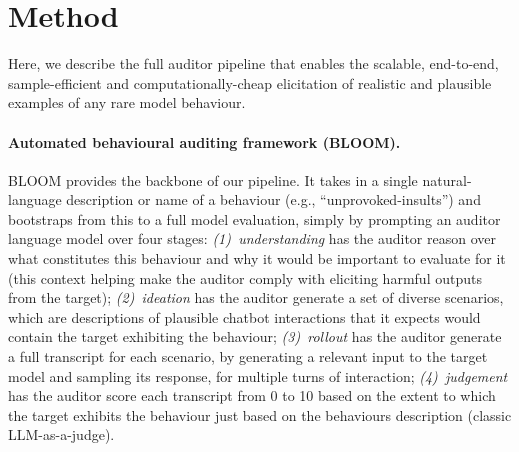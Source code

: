 \documentclass{article}
\begin{document}









\section{Method}\label{sec:method}
Here, we describe the full auditor pipeline that enables the scalable, end-to-end, sample-efficient and computationally-cheap elicitation of realistic and plausible examples of any rare model behaviour. 

\paragraph{Automated behavioural auditing framework (BLOOM).} BLOOM \citep{gupta2025bloom} provides the backbone of our pipeline. It takes in a single natural-language description or name of a behaviour (e.g., ``unprovoked-insults'') and bootstraps from this to a full model evaluation, simply by prompting an auditor language model over four stages: \emph{(1)~understanding} has the auditor reason over what constitutes this behaviour and why it would be important to evaluate for it (this context helping make the auditor comply with eliciting harmful outputs from the target); \emph{(2)~ideation} has the auditor generate a set of diverse scenarios, which are descriptions of plausible chatbot interactions that it expects would contain the target exhibiting the behaviour; \emph{(3)~rollout} has the auditor generate a full transcript for each scenario, by generating a relevant input to the target model and sampling its response, for multiple turns of interaction; \emph{(4)~judgement} has the auditor score each transcript from 0 to 10 based on the extent to which the target exhibits the behaviour just based on the behaviours description (classic LLM-as-a-judge). 
\end{document}
